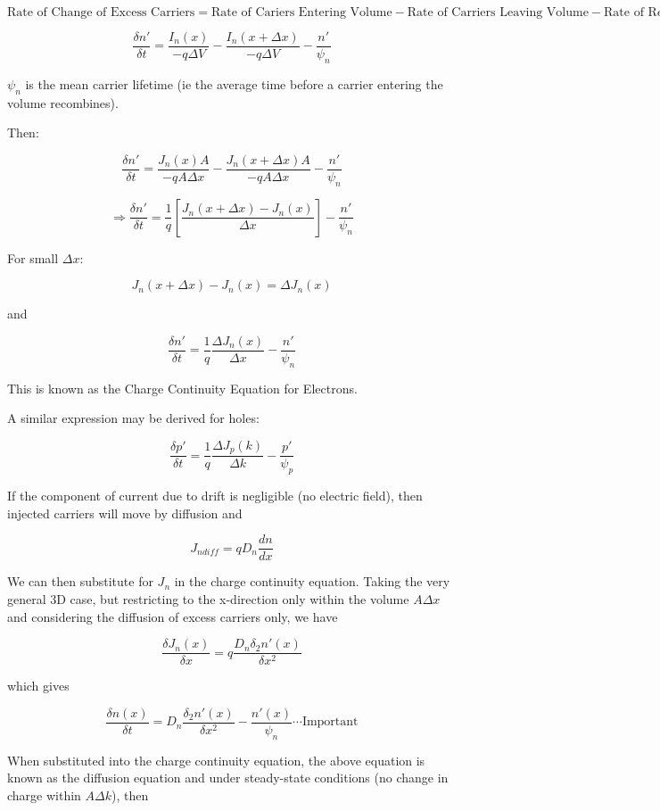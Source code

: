 \documentclass[a4paper,12pt]{article}
\begin{document}
\[\mbox{Rate of Change of Excess Carriers} = \mbox{Rate of Cariers
Entering Volume} - \mbox{Rate of Carriers Leaving Volume} - \mbox{Rate
of Recombination} \]

\[ \frac{\delta n'}{\delta t} = \frac{I_{n}(x)}{- q \Delta V} - \frac{I_{n}(x +
\Delta x)}{-q \Delta V} - \frac{n'}{\psi_{n}} \]

$\psi_{n}$ is the mean carrier lifetime (ie the average time
before a carrier entering the volume recombines).

Then:

\[ \frac{\delta n'}{\delta t} = \frac{J_{n} (x) A}{- q A \Delta x} -
\frac{J_{n}(x + \Delta x) A}{- q A \Delta x} - \frac{n'}{\psi_{n}} \]

\[ \Rightarrow \frac{\delta n'}{\delta t} = \frac{1}{q} \left[
\frac{J_{n}(x + \Delta x) - J_{n}(x)}{\Delta x}\right] -
\frac{n'}{\psi_{n}} \]

For small $\Delta x$:

\[J_{n}(x + \Delta x) - J_{n}(x) = \Delta J_{n}(x) \]

and

\[ \frac{\delta n'}{\delta t} = \frac{1}{q} \frac{\Delta
J_{n}(x)}{\Delta x} - \frac{n'}{\psi_{n}} \]

This is known as the Charge Continuity Equation for Electrons.

A similar expression may be derived for holes:

\[ \frac{\delta p'}{\delta t} = \frac{1}{q} \frac{\Delta
J_{p}(k)}{\Delta k} - \frac{p'}{\psi_{p}} \]

If the component of current due to drift is negligible (no
electric field), then injected carriers will move by diffusion and

\[ J_{n diff} = q D_{n} \frac{dn}{dx} \]

We can then substitute for $J_{n}$ in the charge continuity
equation. Taking the very general 3D case, but restricting to the
x-direction only within the volume $A \Delta x$ and considering the
diffusion of excess carriers only, we have

\[ \frac{\delta J_{n}(x)}{\delta x} = q \frac{D_{n}
\delta_{2}n'(x)}{\delta x^{2}} \]

which gives

\[ \frac{\delta n (x)}{\delta t} = D_{n} \frac{\delta_{2}n'(x)}{\delta
x^{2}} - \frac{n'(x)}{\psi_{n}} \cdots \mbox{Important} \]

When substituted into the charge continuity equation, the
above equation is known as the diffusion equation and under steady-state
conditions (no change in charge within $A \Delta k$), then 
\end{document}
